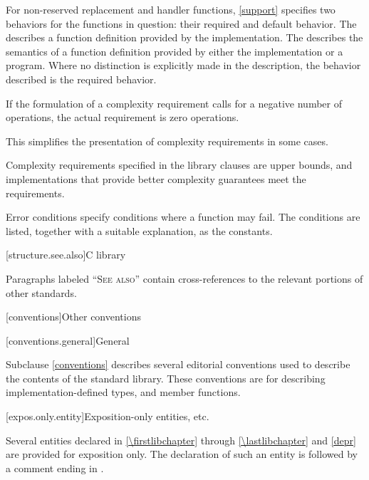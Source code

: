 \pnum
For non-reserved replacement and handler functions,
\ref{support} specifies two behaviors for the functions in question:
their required and default behavior.
The 
describes a function definition provided by the implementation.
The 
describes the semantics of a function definition provided by
either the implementation or a \Cpp{} program.
Where no distinction is explicitly made in the description, the
behavior described is the required behavior.

\pnum
If the formulation of a complexity requirement calls for a negative number of
operations, the actual requirement is zero operations.
\begin{footnote}
This simplifies
the presentation of complexity requirements in some cases.
\end{footnote}

\pnum
Complexity requirements specified in the library clauses are upper bounds,
and implementations that provide better complexity guarantees meet
the requirements.

\pnum
Error conditions specify conditions where a function may fail. The conditions
are listed, together with a suitable explanation, as the 
constants.

[structure.see.also]{C library}

\pnum
Paragraphs labeled ``\textsc{See also}'' contain cross-references to the relevant portions
of other standards.

[conventions]{Other conventions}

[conventions.general]{General}
%

\pnum
Subclause \ref{conventions} describes several editorial conventions used to describe the contents
of the \Cpp{} standard library.
These conventions are for describing
implementation-defined types,
and member functions.

[expos.only.entity]{Exposition-only entities, etc.}

\pnum
Several entities
declared in \ref{\firstlibchapter} through \ref{\lastlibchapter} and \ref{depr}
are provided for exposition only.
The declaration of such an entity
is followed by a comment ending in \expos.

